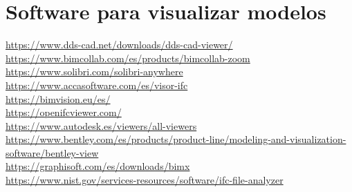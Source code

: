 \documentclass[spanish,12pt,a4paper,final,oneside]{book}
\begin{document}
\section{Software para visualizar modelos}
\url{https://www.dds-cad.net/downloads/dds-cad-viewer/}
\\ \url{https://www.bimcollab.com/es/products/bimcollab-zoom}
\\ \url{https://www.solibri.com/solibri-anywhere}
\\ \url{https://www.accasoftware.com/es/visor-ifc}
\\ \url{https://bimvision.eu/es/}
\\ \url{https://openifcviewer.com/}
\\ \url{https://www.autodesk.es/viewers/all-viewers}
\\ \url{https://www.bentley.com/es/products/product-line/modeling-and-visualization-software/bentley-view}
\\ \url{https://graphisoft.com/es/downloads/bimx}
\\ \url{https://www.nist.gov/services-resources/software/ifc-file-analyzer}
\end{document}
